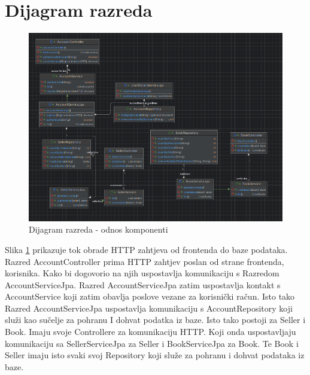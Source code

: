 			\eject
			
			
		\section{Dijagram razreda}
		
			\begin{figure}[H]
				\includegraphics[scale=0.4]{slike/DijagramRazreda-OdnosKomponenti.png} %
				\centering
				\caption{Dijagram razreda - odnos komponenti}
				\label{fig:DijRaz - odnos}
			\end{figure}
			
			Slika \ref{fig:DijRaz - odnos} prikazuje tok obrade HTTP zahtjeva od frontenda do baze podataka. Razred AccountController prima HTTP zahtjev poslan od strane frontenda, korisnika. Kako bi dogovorio na njih uspostavlja komunikaciju s Razredom AccountServiceJpa. Razred AccountServiceJpa zatim uspostavlja kontakt s AccountService koji zatim obavlja poslove vezane za korisnički račun. Isto tako Razred AccountServiceJpa uspostavlja komunikaciju s AccountRepository koji služi kao sučelje za pohranu I dohvat podatka iz baze.  Isto tako postoji za Seller i Book. Imaju svoje Controllere za komunikaciju HTTP. Koji onda uspostavljaju komunikaciju sa SellerServiceJpa za Seller i BookServiceJpa za Book. Te Book i Seller imaju isto svaki svoj Repository koji služe za pohranu i dohvat podataka iz baze.
			
